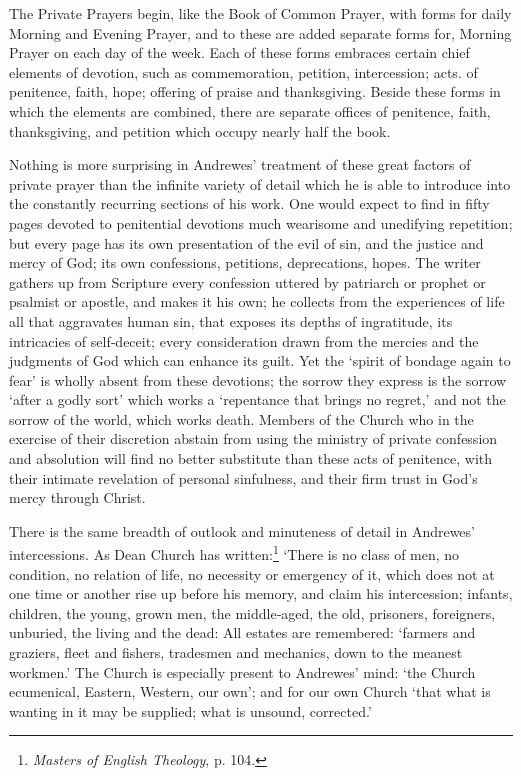 The Private Prayers begin, like the Book of Common Prayer, with forms for daily Morning and Evening Prayer, and to these are added separate forms for, Morning Prayer on each day of the week. Each of these forms embraces certain chief elements of devotion, such as commemoration, petition, intercession; acts. of penitence, faith, hope; offering of praise and thanksgiving. Beside these forms in which the elements are combined, there are separate offices of penitence, faith, thanksgiving, and petition which occupy nearly half the book.

Nothing is more surprising in Andrewes’ treatment of these great factors of private prayer than the infinite variety of detail which he is able to introduce into the constantly recurring sections of his work. One would expect to find in fifty pages devoted to penitential devotions much wearisome and unedifying repetition; but every page has its own presentation of the evil of sin, and the justice and mercy of God; its own confessions, petitions, deprecations, hopes. The writer gathers up from Scripture every confession uttered by patriarch or prophet or psalmist or apostle, and makes it his own; he collects from the experiences of life all that aggravates human sin, that exposes its depths of ingratitude, its intricacies of self‑deceit; every consideration drawn from the mercies and the judgments of God which can enhance its guilt. Yet the ‘spirit of bondage again to fear’ is wholly absent from these devotions; the sorrow they express is the sorrow ‘after a godly sort’ which works a ‘repentance that brings no regret,’ and not the sorrow of the world, which works death. Members of the Church who in the exercise of their discretion abstain from using the ministry of private confession and absolution will find no better substitute than these acts of penitence, with their intimate revelation of personal sinfulness, and their firm trust in God’s mercy through Christ.

There is the same breadth of outlook and minuteness of detail in Andrewes’ intercessions. As Dean Church has written:\footnote{\emph{Masters of English Theology}, p. 104.} ‘There is no class of men, no condition, no relation of life, no necessity or emergency of it, which does not at one time or another rise up before his memory, and claim his intercession; infants, children, the young, grown men, the middle‑aged, the old, prisoners, foreigners, unburied,  the living and the dead: All estates are remembered: ‘farmers and graziers, fleet and fishers, tradesmen and mechanics, down to the meanest workmen.’ The Church is especially present to Andrewes’ mind: ‘the Church ecumenical, Eastern, Western, our own’; and for our own Church ‘that what is wanting in it may be supplied; what is unsound, corrected.’

